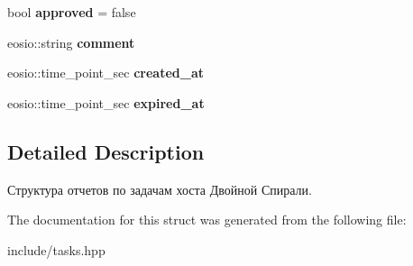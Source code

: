 \begin{DoxyCompactItemize}
\mbox{\label{structreports_a6d50a6e90ba618ec5d52efc240046a26}} 
bool {\bfseries approved} = false
\item 
\mbox{\label{structreports_a1ce6d16d14ae74682d69f3d862da506e}} 
eosio\+::string {\bfseries comment}
\item 
\mbox{\label{structreports_a28cdf141767802ed2ca9ff1722c40da8}} 
eosio\+::time\+\_\+point\+\_\+sec {\bfseries created\+\_\+at}
\item 
\mbox{\label{structreports_a59d4ea3c9f3e0175443b86b5140a752a}} 
eosio\+::time\+\_\+point\+\_\+sec {\bfseries expired\+\_\+at}
\end{DoxyCompactItemize}


\subsection{Detailed Description}
Структура отчетов по задачам хоста Двойной Спирали. 

The documentation for this struct was generated from the following file\+:\begin{DoxyCompactItemize}
\item 
include/tasks.\+hpp\end{DoxyCompactItemize}
